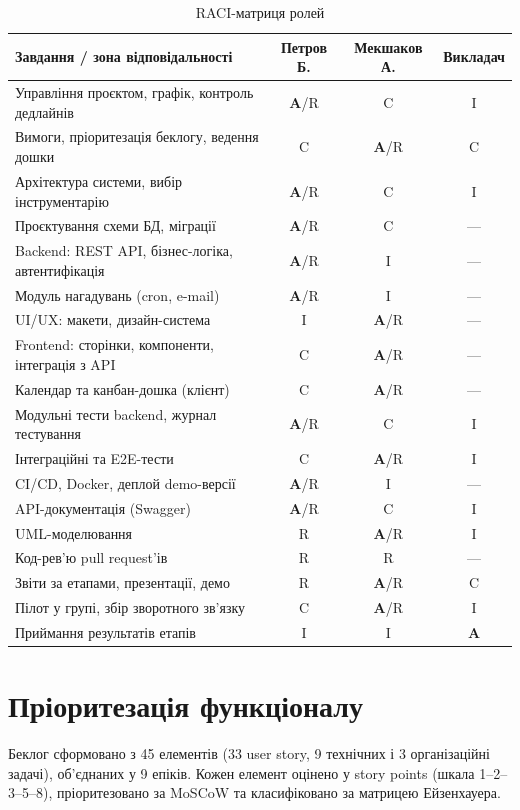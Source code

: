 \documentclass[12pt]{article}
\begin{document}
\begin{table}[h]
\centering
\renewcommand{\arraystretch}{1.2}
\begin{tabularx}{\textwidth}{Y c c c}
\toprule
\textbf{Завдання / зона відповідальності} & \textbf{Петров Б.} & \textbf{Мекшаков А.} & \textbf{Викладач}\\
\midrule
Управління проєктом, графік, контроль дедлайнів & \textbf{A}/R & C & I\\
Вимоги, пріоритезація беклогу, ведення дошки & C & \textbf{A}/R & C\\
Архітектура системи, вибір інструментарію & \textbf{A}/R & C & I\\
Проєктування схеми БД, міграції & \textbf{A}/R & C & ---\\
Backend: REST API, бізнес-логіка, автентифікація & \textbf{A}/R & I & ---\\
Модуль нагадувань (cron, e-mail) & \textbf{A}/R & I & ---\\
UI/UX: макети, дизайн-система & I & \textbf{A}/R & ---\\
Frontend: сторінки, компоненти, інтеграція з API & C & \textbf{A}/R & ---\\
Календар та канбан-дошка (клієнт) & C & \textbf{A}/R & ---\\
Модульні тести backend, журнал тестування & \textbf{A}/R & C & I\\
Інтеграційні та E2E-тести & C & \textbf{A}/R & I\\
CI/CD, Docker, деплой demo-версії & \textbf{A}/R & I & ---\\
API-документація (Swagger) & \textbf{A}/R & C & I\\
UML-моделювання & R & \textbf{A}/R & I\\
Код-рев'ю pull request'ів & R & R & ---\\
Звіти за етапами, презентації, демо & R & \textbf{A}/R & C\\
Пілот у групі, збір зворотного зв'язку & C & \textbf{A}/R & I\\
Приймання результатів етапів & I & I & \textbf{A}\\
\bottomrule
\end{tabularx}
\caption{RACI-матриця ролей}
\end{table}

\section{Пріоритезація функціоналу}
Беклог сформовано з 45 елементів (33 user story, 9 технічних і 3 організаційні задачі), об'єднаних у 9 епіків. Кожен елемент оцінено у story points (шкала 1--2--3--5--8), пріоритезовано за MoSCoW та класифіковано за матрицею Ейзенхауера.
\end{document}
